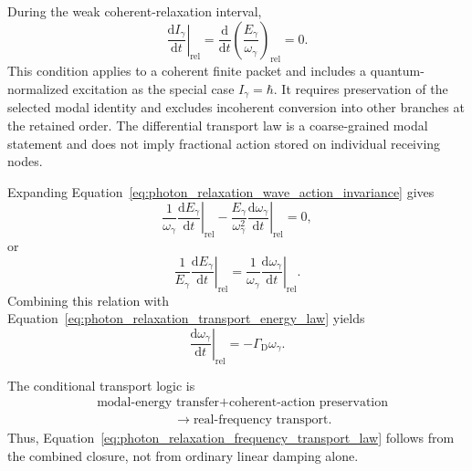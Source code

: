 During the weak coherent-relaxation interval,
\begin{equation}
    \left.
    \frac{
        \mathrm dI_\gamma
    }{
        \mathrm dt
    }
    \right|_{\mathrm{rel}}
    =
    \frac{\mathrm d}{\mathrm dt}
    \left(
        \frac{
            E_\gamma
        }{
            \omega_\gamma
        }
    \right)_{\mathrm{rel}}
    =
    0.
    \label{eq:photon_relaxation_wave_action_invariance}
\end{equation}
This condition applies to a coherent finite packet and includes a
quantum-normalized excitation as the special case \(I_\gamma=\hbar\). It
requires preservation of the selected modal identity and excludes incoherent
conversion into other branches at the retained order. The differential
transport law is a coarse-grained modal statement and does not imply
fractional action stored on individual receiving nodes.

Expanding
Equation~\eqref{eq:photon_relaxation_wave_action_invariance} gives
\begin{equation}
    \frac{1}{\omega_\gamma}
    \left.
    \frac{
        \mathrm dE_\gamma
    }{
        \mathrm dt
    }
    \right|_{\mathrm{rel}}
    -
    \frac{
        E_\gamma
    }{
        \omega_\gamma^{2}
    }
    \left.
    \frac{
        \mathrm d\omega_\gamma
    }{
        \mathrm dt
    }
    \right|_{\mathrm{rel}}
    =
    0,
    \label{eq:photon_relaxation_wave_action_expansion}
\end{equation}
or
\begin{equation}
    \frac{1}{E_\gamma}
    \left.
    \frac{
        \mathrm dE_\gamma
    }{
        \mathrm dt
    }
    \right|_{\mathrm{rel}}
    =
    \frac{1}{\omega_\gamma}
    \left.
    \frac{
        \mathrm d\omega_\gamma
    }{
        \mathrm dt
    }
    \right|_{\mathrm{rel}}.
    \label{eq:photon_relaxation_equal_fractional_rates}
\end{equation}
Combining this relation with
Equation~\eqref{eq:photon_relaxation_transport_energy_law} yields
\begin{equation}
    \boxed{
    \left.
    \frac{
        \mathrm d\omega_\gamma
    }{
        \mathrm dt
    }
    \right|_{\mathrm{rel}}
    =
    -\Gamma_{\mathrm D}\omega_\gamma.
    }
    \label{eq:photon_relaxation_frequency_transport_law}
\end{equation}

The conditional transport logic is
\begin{equation}
    \begin{aligned}
        &\text{modal-energy transfer}
        +
        \text{coherent-action preservation}
        \\
        &\hspace{6em}
        \longrightarrow
        \text{real-frequency transport}.
    \end{aligned}
    \label{eq:photon_relaxation_frequency_transport_logic}
\end{equation}
Thus,
Equation~\eqref{eq:photon_relaxation_frequency_transport_law} follows from
the combined closure, not from ordinary linear damping alone.

